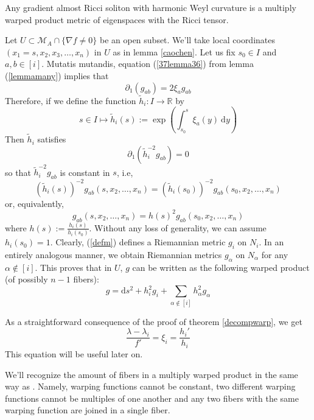 \begin{teorema}\label{decompwarp}
    Any gradient almost Ricci soliton with harmonic Weyl curvature is a multiply warped product metric of eigenspaces with the Ricci tensor.
    \end{teorema}
    
    \begin{demm}
    Let $U \subset \mathcal{M}_A \cap \{ \nabla f \neq 0 \}$ be an open subset. We'll take local coordinates $(x_1 = s, x_2, x_3, \ldots, x_n)$ in $U$ as in lemma \ref{caochen}. Let us fix $s_0 \in I$ and $a, b \in [i]$. Mutatis mutandis, equation (\ref{37lemma36}) from lemma (\ref{lemmamany}) implies that 
    \[
    \partial_1(g_{ab}) = 2 \xi_a g_{ab}
    \]
    Therefore, if we define the function $\tilde{h}_i: I \to \mathbb{R}$ by
    \[
    s \in I \mapsto \tilde{h}_i(s) := \operatorname{exp}\left(\int_{s_0}^s \xi_a(y) \ \mathrm{d} y \right)
    \]
    Then $\tilde{h}_i$ satisfies
    \[
    \partial_1\left(\tilde{h}_i^{-2} g_{ab} \right) = 0
    \]
    so that $\tilde{h}^{-2}_i g_{ab}$ is constant in $s$, i.e, 
    \[
    (\tilde{h}_i(s))^{-2} g_{ab}(s, x_2, \ldots, x_n) = (\tilde{h}_i(s_0))^{-2} g_{ab}(s_0, x_2, \ldots, x_n)
    \]
    or, equivalently,
    \begin{equation}\label{defm}
    g_{ab}(s, x_2, \ldots, x_n) = h(s)^2 g_{ab}(s_0, x_2, \ldots, x_n)
    \end{equation}
    where $h(s) := \frac{h_i(s)}{h_i(s_0)}$. Without any loss of generality, we can assume $h_i(s_0) = 1$. Clearly, (\ref{defm}) defines a Riemannian metric $g_i$ on $N_i$. In an entirely analogous manner, we obtain Riemannian metrics $g_{\alpha}$ on $N_{\alpha}$ for any $\alpha \notin [i]$. This proves that in $U$, $g$ can be written as the following warped product (of possibly $n-1$ fibers):
    \[
    g = \mathrm{d}s^2 + h_i^2 g_i + \sum_{\alpha \notin [i]} h_{\alpha}^2 g_{\alpha}
    \]
    \end{demm}
    
    \begin{oobs}
        As a straightforward consequence of the proof of theorem \cref{decompwarp}, we get 
        \begin{equation}\label{eqXiRelFuncWarp}
            \frac{\lambda - \lambda_i}{f'} = \xi_i = \frac{h_{i}'}{h_i}
        \end{equation}
        This equation will be useful later on.
    \end{oobs}

    \begin{oobs}
        We'll recognize the amount of fibers in a multiply warped product in the same way as . Namely, warping functions cannot be constant, two different warping functions cannot be multiples of one another and any two fibers with the same warping function are joined in a single fiber. 
        \end{oobs}

